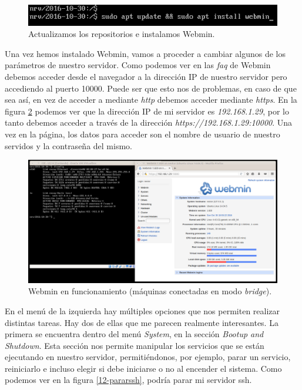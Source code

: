 \documentclass[a4paper,titlepage,12pt]{scrartcl}	%
\numberwithin{figure}{section} %
\numberwithin{table}{section} %
\begin{document}
	\begin{figure}[H]
		\includegraphics[width=\linewidth]{./Imagenes/12-3-webmin.png}
		\vspace{-0.5cm}
		\caption[Actualizamos los repositorios e instalamos Webmin.]{Actualizamos los repositorios e instalamos Webmin.}
		\label{12-3-webmin}
	\end{figure}
	
	Una vez hemos instalado Webmin, vamos a proceder a cambiar algunos de los parámetros de nuestro servidor. Como podemos ver en las \textit{faq} de Webmin \cite{webminfaq} debemos acceder desde el navegador a la dirección IP de nuestro servidor pero accediendo al puerto 10000. Puede ser que esto nos de problemas, en caso de que sea así, en vez de acceder a mediante \textit{http} debemos acceder mediante \textit{https}. En la figura \ref{12-webmin} podemos ver que la dirección IP de mi servidor es \textit{192.168.1.29}, por lo tanto debemos acceder a través de la dirección \textit{https://192.168.1.29:10000}. Una vez en la página, los datos para acceder son el nombre de usuario de nuestro servidos y la contraseña del mismo.
	
	\begin{figure}[H]
		\centering
		\includegraphics[scale=0.28]{./Imagenes/12-webmin.png}
		\caption[Webmin en funcionamiento (máquinas conectadas en modo \textit{bridge}).]{Webmin en funcionamiento (máquinas conectadas en modo \textit{bridge}).}
		\label{12-webmin}
	\end{figure}
	
	En el menú de la izquierda hay múltiples opciones que nos permiten realizar distintas tareas. Hay dos de ellas que me parecen realmente interesantes. La primera se encuentra dentro del menú \textit{System}, en la sección \textit{Bootup and Shutdown}. Esta sección nos permite manipular los servicios que se están ejecutando en nuestro servidor, permitiéndonos, por ejemplo, parar un servicio, reiniciarlo e incluso elegir si debe iniciarse o no al encender el sistema. Como podemos ver en la figura \ref{12-pararssh}, podría parar mi servidor ssh.
	
\end{document}
